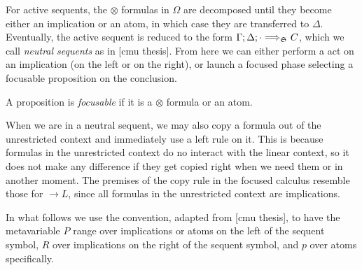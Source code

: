 For active sequents, the $\otimes$ formulas in $\Omega$ are decomposed until
they become either an implication or an atom, in which case they are transferred
to $\Delta$. Eventually, the active sequent is reduced to the form
$\Gamma; \Delta; \cdot \Longrightarrow_{\mathfrak{S}_{}} C$, which we call
\emph{neutral sequents} as in [cmu thesis]. From here we can either perform a
act on an implication (on the left or on the right), or launch a focused phase
selecting a focusable proposition on the conclusion.

\begin{definition}
  A proposition is \emph{focusable} if it is a $\otimes$ formula or an atom.
\end{definition}

When we are in a neutral sequent, we may also copy a formula out of the
unrestricted context and immediately use a left rule on it. This is because
formulas in the unrestricted context do no interact with the linear context, so
it does not make any difference if they get copied right when we need them or in
another moment. The premises of the copy rule in the focused calculus resemble
those for $\rightarrow L$, since all formulas in the unrestricted context are
implications.

In what follows we use the convention, adapted from [cmu thesis], to have the
metavariable $P$ range over implications or atoms on the left of the sequent
symbol, $R$ over implications on the right of the sequent symbol, and $p$ over
atoms specifically.

